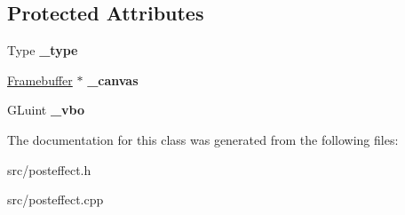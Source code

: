 \subsection*{Protected Attributes}
\begin{DoxyCompactItemize}
\item 
\hypertarget{class_post_effect_a674a1249e292efc6493dd612e7a96fd8}{}Type {\bfseries \+\_\+type}\label{class_post_effect_a674a1249e292efc6493dd612e7a96fd8}

\item 
\hypertarget{class_post_effect_a47c4b370fe5cdb4770555261476c0fcb}{}\hyperlink{class_framebuffer}{Framebuffer} $\ast$ {\bfseries \+\_\+canvas}\label{class_post_effect_a47c4b370fe5cdb4770555261476c0fcb}

\item 
\hypertarget{class_post_effect_a9df8cf2b75b102fc552c257d30cb739e}{}G\+Luint {\bfseries \+\_\+vbo}\label{class_post_effect_a9df8cf2b75b102fc552c257d30cb739e}

\end{DoxyCompactItemize}


The documentation for this class was generated from the following files\+:\begin{DoxyCompactItemize}
\item 
src/posteffect.\+h\item 
src/posteffect.\+cpp\end{DoxyCompactItemize}
